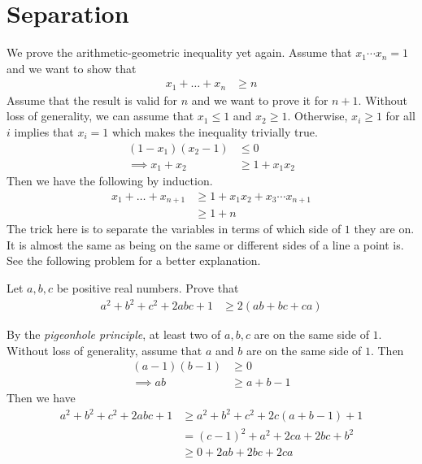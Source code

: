 \documentclass[inequalities.tex]{subfile}
\begin{document}
	\section{Separation}
	We prove the arithmetic-geometric inequality yet again. Assume that $x_{1}\cdots x_{n}=1$ and we want to show that
		\begin{align*}
			x_{1}+\ldots+x_{n}
				& \geq n
		\end{align*}
	Assume that the result is valid for $n$ and we want to prove it for $n+1$. Without loss of generality, we can assume that $x_{1}\leq 1$ and $x_{2}\geq 1$. Otherwise, $x_{i}\geq 1$ for all $i$ implies that $x_{i}=1$ which makes the inequality trivially true.
		\begin{align*}
			(1-x_{1})(x_{2}-1)
				& \leq 0\\
			\implies x_{1}+x_{2}
				& \geq 1+x_{1}x_{2}
		\end{align*}
	Then we have the following by induction.
		\begin{align*}
			x_{1}+\ldots+x_{n+1}
				& \geq 1+x_{1}x_{2}+x_{3}\cdots x_{n+1}\\
				& \geq 1+n
		\end{align*}
	The trick here is to separate the variables in terms of which side of $1$ they are on. It is almost the same as being on the same or different sides of a line a point is. See the following problem for a better explanation.
		\begin{problem}
			Let $a,b,c$ be positive real numbers. Prove that
				\begin{align*}
					a^{2}+b^{2}+c^{2}+2abc+1
						& \geq 2(ab+bc+ca)
				\end{align*}

				\begin{solution}
					By the \textit{pigeonhole principle}, at least two of $a,b,c$ are on the same side of $1$. Without loss of generality, assume that $a$ and $b$ are on the same side of $1$. Then
						\begin{align*}
							(a-1)(b-1)
								& \geq 0\\
							\implies ab
								& \geq a+b-1
						\end{align*}
					Then we have
						\begin{align*}
							a^{2}+b^{2}+c^{2}+2abc+1
								& \geq a^{2}+b^{2}+c^{2}+2c(a+b-1)+1\\
								& = (c-1)^{2}+a^{2}+2ca+2bc+b^{2}\\
								& \geq 0+2ab+2bc+2ca
						\end{align*}
				\end{solution}
		\end{problem}
\end{document}
